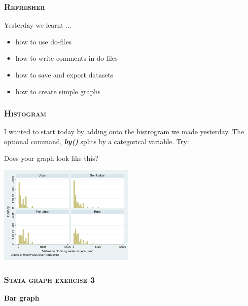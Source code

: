 \documentclass[10pt]{beamer}
\begin{document}
	\begin{frame}
		\frametitle{\textsc{Refresher}}
		Yesterday we learnt ...
		\begin{itemize}
			\item how to use do-files
			\item how to write comments in do-files
			\item how to save and export datasets
			\item how to create simple graphs
		\end{itemize}
	\end{frame}
	
	\begin{frame}
	\frametitle{\textsc{Histogram}}
		 I wanted to start today by adding onto the histrogram we made yesterday.
		\onslide<2-> The optional command, \textbf{\textit{by()}} 
					 splits by a categorical variable. Try:
	
\begin{stlog}\end{stlog}
		 Does your graph look like this?
	
\begin{center}
    \includegraphics[width=0.5\textwidth]{hist_3.pdf}
\end{center}
	\end{frame}

	\begin{frame}
	\frametitle{\textsc{Stata graph exercise 3}}
		\begin{center}
		\Large \textbf{Bar graph}
		\end{center}
	\end{frame}		
	
\end{document}
